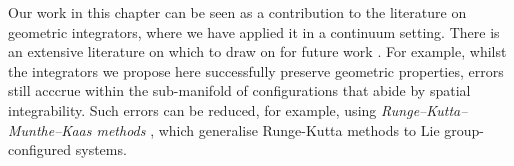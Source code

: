  Our work in this chapter can be seen as a contribution to the literature on geometric integrators, where we have applied it in a continuum setting. There is an extensive literature on which to draw on for future work \citep{celledoniIntroductionLieGroup2014c, owrenLieGroupIntegrators2016, iserlesLiegroupMethods2005, celledoniLieGroupIntegrators2022a, munthe-kaasHighOrderRungeKutta1999, buddGeometricIntegrationNumerical1999, engoNumericalIntegrationLie2001}. For example, whilst the integrators we propose here successfully preserve geometric properties, errors still acccrue within the sub-manifold of configurations that abide by spatial integrability. Such errors can be reduced, for example, using \textit{Runge–Kutta–Munthe–Kaas methods} \citep{munthe-kaasRungeKuttaMethodsLie1998, munthe-kaasHighOrderRungeKutta1999}, which generalise Runge-Kutta methods \citep{ascherComputerMethodsOrdinary1998} to Lie group-configured systems.


